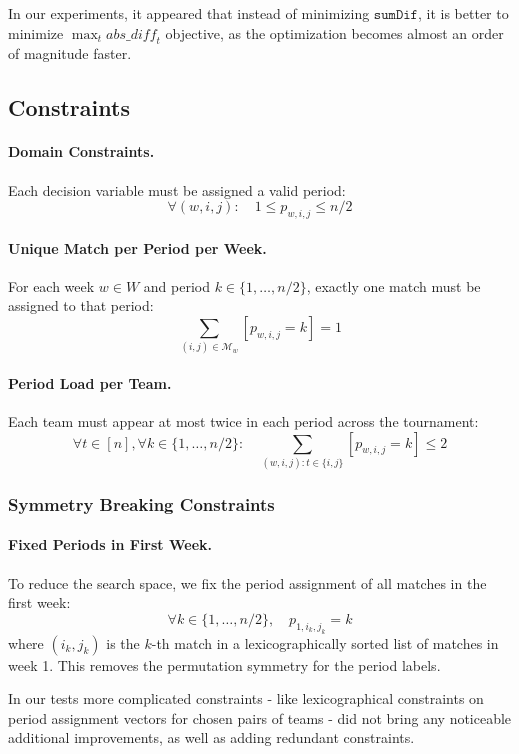 \documentclass{article}
\begin{document}
In our experiments, it appeared that instead of minimizing $\texttt{sumDif}$, it is better to minimize $\max_{t}\mathit{abs\_diff}_t$ objective, as the optimization becomes almost an order of magnitude faster.
\subsection{Constraints}

\paragraph{Domain Constraints.}
Each decision variable must be assigned a valid period:
\[
\forall (w,i,j): \quad 1 \leq p_{w,i,j} \leq n/2
\]

\paragraph{Unique Match per Period per Week.}
For each week $w \in W$ and period $k \in \{1, \dots, n/2\}$, exactly one match must be assigned to that period:
\[
\sum_{(i,j) \in \mathcal{M}_w} [p_{w,i,j} = k] = 1
\]

\paragraph{Period Load per Team.}
Each team must appear at most twice in each period across the tournament:
\[
\forall t \in [n], \forall k \in \{1, \dots, n/2\}: \quad \sum_{(w,i,j) : t \in \{i,j\}} [p_{w,i,j} = k] \leq 2
\]

\subsubsection*{Symmetry Breaking Constraints}

\paragraph{Fixed Periods in First Week.}
To reduce the search space, we fix the period assignment of all matches in the first week:
\[
\forall k \in \{1, \dots, n/2\},\quad p_{1,i_k,j_k} = k
\]
where $(i_k, j_k)$ is the $k$-th match in a lexicographically sorted list of matches in week 1. This removes the permutation symmetry for the period labels.

In our tests more complicated constraints - like lexicographical constraints on period assignment vectors for chosen pairs of teams - did not bring any noticeable additional improvements, as well as adding redundant constraints. 
\end{document}
